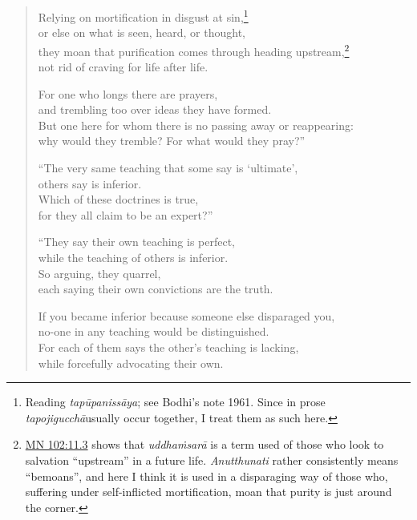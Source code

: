 \documentclass[12pt,openany]{book}%
\begin{document}
\begin{verse}
Relying on mortification in disgust at sin,\footnote{Reading \textit{\textsanskrit{tapūpanissāya}}; see Bodhi’s note 1961. Since in prose \textit{\textsanskrit{tapojigucchā}}usually occur together, I treat them as such here. } \\
or else on what is seen, heard, or thought, \\
they moan that purification comes through heading upstream,\footnote{\href{https://suttacentral.net/mn102/en/sujato\#11.3}{MN 102:11.3} shows that \textit{\textsanskrit{uddhaṁsarā}} is a term used of those who look to salvation “upstream” in a future life. \textit{Anutthunati} rather consistently means “bemoans”, and here I think it is used in a disparaging way of those who, suffering under self-inflicted mortification, moan that purity is just around the corner. } \\
not rid of craving for life after life. 

For one who longs there are prayers, \\
and trembling too over ideas they have formed. \\
But one here for whom there is no passing away or reappearing: \\
why would they tremble? For what would they pray?” 

“The very same teaching that some say is ‘ultimate’, \\
others say is inferior. \\
Which of these doctrines is true, \\
for they all claim to be an expert?” 

“They say their own teaching is perfect, \\
while the teaching of others is inferior. \\
So arguing, they quarrel, \\
each saying their own convictions are the truth. 

If you became inferior because someone else disparaged you, \\
no-one in any teaching would be distinguished. \\
For each of them says the other’s teaching is lacking, \\
while forcefully advocating their own. 


\end{verse}
\end{document}
